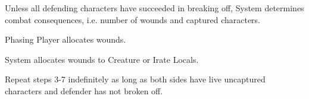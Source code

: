 \documentclass[twoside,letterpaper]{article}
\begin{document}
\begin{usecase}
{\begin{enumerate}
			\end{enumerate}
		\item Unless all defending characters have succeeded in breaking off, System determines combat consequences, i.e. number of wounds and captured characters.
		\item Phasing Player allocates wounds.
		\item System allocates wounds to Creature or Irate Locals.
		\item Repeat steps 3-7 indefinitely as long as both sides have live uncaptured characters and defender has not broken off.
	}
	  \finalize
\end{usecase}

\clearpage
\end{document}
